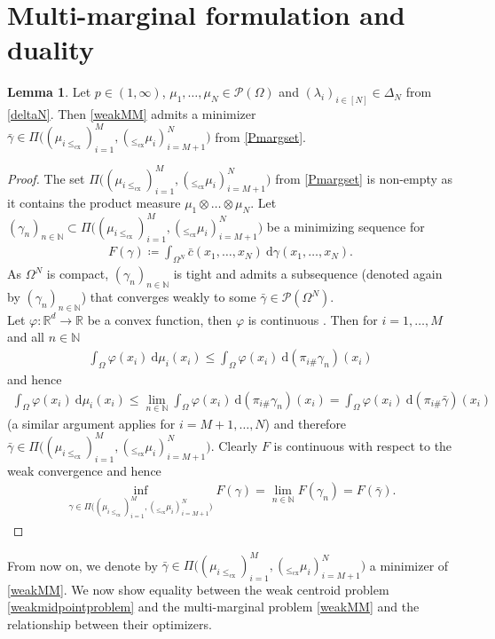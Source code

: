 \documentclass[letterpaper]{amsart}
\newcommand{\RR}{\mathbb{R}}
\newcommand{\NN}{\mathbb{N}}
\newcommand{\dd}{\mathrm{d}}
\theoremstyle{definition}
\newtheorem{lma}[thm]{Lemma}
\begin{document}
\section{Multi-marginal formulation and duality}
\begin{lma}
	Let $p\in(1,\infty)$, $\mu_1,\dots,\mu_N\in\mathcal P(\Omega)$ and $(\lambda_i)_{i\in[N]}\in\Delta_N$ from \eqref{deltaN}. Then
	\eqref{weakMM} admits a minimizer $\bar\gamma\in \Pi\big((\mu_{i\leq_{\text{cx}}})_{i=1}^M,(_{\leq_{\text{cx}}}\mu_i)_{i=M+1}^N\big)$ from \eqref{Pmargset}.
\end{lma}
\begin{proof}
	The set $\Pi\big((\mu_{i\leq_{\text{cx}}})_{i=1}^M,(_{\leq_{\text{cx}}}\mu_i)_{i=M+1}^N\big)$ from \eqref{Pmargset} is non-empty as it contains the product measure $\mu_1\otimes\dots\otimes\mu_N$. Let $(\gamma_n)_{n\in\NN}\subset\Pi\big((\mu_{i\leq_{\text{cx}}})_{i=1}^M,(_{\leq_{\text{cx}}}\mu_i)_{i=M+1}^N\big)$ be a minimizing sequence for 
	\begin{gather*}
		F(\gamma)\coloneqq\int_{\Omega^N}\bar c(x_1,\dots,x_N)\ \dd\gamma(x_1,\dots,x_N).
	\end{gather*}
	As $\Omega^N$ is compact, $(\gamma_n)_{n\in\NN}$ is tight and admits a subsequence (denoted again by $(\gamma_n)_{n\in\NN}$) that converges weakly to some $\bar\gamma\in\mathcal P(\Omega^N)$.\\
	Let $\varphi:\RR^d\rightarrow\RR$ be a convex function, then $\varphi$ is continuous \cite[Cor 10.1.1]{rockafellar1997}. Then for $i=1,\dots,M$ and all $n\in\NN$
	\begin{gather*}
		\int_\Omega\varphi(x_i)\ \dd\mu_i(x_i)\leq\int_\Omega\varphi(x_i)\ \dd(\pi_{i\#}\gamma_n)(x_i)
	\end{gather*}
	and hence
	\begin{gather*}
		\int_\Omega\varphi(x_i)\ \dd\mu_i(x_i)\leq\lim_{n\in\NN}\int_\Omega\varphi(x_i)\ \dd(\pi_{i\#}\gamma_n)(x_i)=\int_\Omega\varphi(x_i)\ \dd(\pi_{i\#}\bar\gamma)(x_i)
	\end{gather*}
	(a similar argument applies for $i=M+1,\dots,N$) and therefore\\ $\bar\gamma\in\Pi\big((\mu_{i\leq_{\text{cx}}})_{i=1}^M,(_{\leq_{\text{cx}}}\mu_i)_{i=M+1}^N\big)$.
	Clearly $F$ is continuous with respect to the weak convergence and hence
	\begin{gather*}
		\inf_{\gamma\in\Pi\big((\mu_{i\leq_{\text{cx}}})_{i=1}^M,(_{\leq_{\text{cx}}}\mu_i)_{i=M+1}^N\big)}F(\gamma)=\lim_{n\in\NN}F(\gamma_n)=F(\bar\gamma).
	\end{gather*}
\end{proof}
From now on, we denote by $\bar\gamma\in\Pi\big((\mu_{i\leq_{\text{cx}}})_{i=1}^M,(_{\leq_{\text{cx}}}\mu_i)_{i=M+1}^N\big)$ a minimizer of \eqref{weakMM}.
We now show equality between the weak centroid problem \eqref{weakmidpointproblem} and the multi-marginal problem \eqref{weakMM} and the relationship between their optimizers.
\end{document}
